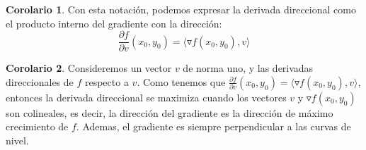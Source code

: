 \documentclass[10pt]{article}
\theoremstyle{definition}
\newtheorem{corollary}{Corolario}[theorem]
\begin{document}
\begin{corollary}
    Con esta notación, podemos expresar la derivada direccional como el producto interno del gradiente con la dirección: $$\frac{\partial f}{\partial v}(x_0,y_0)=\langle \triangledown f(x_0,y_0),v\rangle$$
\end{corollary}
\begin{corollary}
    Consideremos un vector $v$ de norma uno, y las derivadas direccionales de $f$ respecto a $v$. Como tenemos que $\frac{\partial f}{\partial v}(x_0,y_0)=\langle\triangledown f(x_0,y_0),v\rangle$, entonces la derivada direccional se maximiza cuando los vectores $v$ y $\triangledown f(x_0,y_0)$ son colineales, es decir, la dirección del gradiente es la dirección de máximo crecimiento de $f$. Ademas, el gradiente es siempre perpendicular a las curvas de nivel.
\end{corollary}
\end{document}
